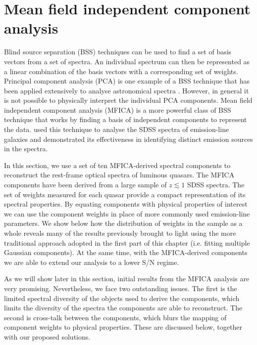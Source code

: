\section{Mean field independent component analysis}

Blind source separation (BSS) techniques can be used to find a set of basis vectors from a set of spectra.
An individual spectrum can then be represented as a linear combination of the basis vectors with a corresponding set of weights.
Principal component analysis (PCA) is one example of a BSS technique that has been applied extensively to analyse astronomical spectra \citep[e.g.][]{mittaz90,francis92,yip04}.
However, in general it is not possible to physically interpret the individual PCA components.
Mean field independent component analysis (MFICA) is a more powerful class of BSS technique that works by finding a basis of independent components to represent the data.
\citet{allen13} used this technique to analyse the SDSS spectra of emission-line galaxies and demonstrated its effectiveness in identifying distinct emission sources in the spectra.

In this section, we use a set of ten MFICA-derived spectral components to reconstruct the rest-frame optical spectra of luminous quasars.
The MFICA components have been derived from a large sample of $z \lesssim 1$ SDSS spectra.
The set of weights measured for each quasar provide a compact representation of its spectral properties.
By equating components with physical properties of interest we can use the component weights in place of more commonly used emission-line parameters.
We show below how the distribution of weights in the sample as a whole reveals many of the results previously brought to light using the more traditional approach adopted in the first part of this chapter (i.e. fitting multiple Gaussian components).
At the same time, with the MFICA-derived components we are able to extend our analysis to a lower S/N regime.

As we will show later in this section, initial results from the MFICA analysis are very promising.
Nevertheless, we face two outstanding issues.
The first is the limited spectral diversity of the objects used to derive the components, which limits the diversity of the spectra the components are able to reconstruct.
The second is cross-talk between the components, which blurs the mapping of component weights to physical properties.
These are discussed below, together with our proposed solutions.

